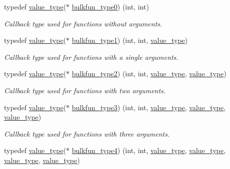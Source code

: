 \begin{DoxyCompactItemize}
typedef \hyperlink{namespacemu_a17d4f113a4b88b8d971cca8ddbbe8a47}{value\+\_\+type}($\ast$ \hyperlink{namespacemu_aff9adf757e90a2398326a3cb10585cf1}{bulkfun\+\_\+type0}) (int, int)
\begin{DoxyCompactList}\small\item\em Callback type used for functions without arguments. \end{DoxyCompactList}\item 
typedef \hyperlink{namespacemu_a17d4f113a4b88b8d971cca8ddbbe8a47}{value\+\_\+type}($\ast$ \hyperlink{namespacemu_a2bd588710432e6e34eae3e2af4ba3862}{bulkfun\+\_\+type1}) (int, int, \hyperlink{namespacemu_a17d4f113a4b88b8d971cca8ddbbe8a47}{value\+\_\+type})
\begin{DoxyCompactList}\small\item\em Callback type used for functions with a single arguments. \end{DoxyCompactList}\item 
typedef \hyperlink{namespacemu_a17d4f113a4b88b8d971cca8ddbbe8a47}{value\+\_\+type}($\ast$ \hyperlink{namespacemu_a9faa755ea34c6e8de3895013e649a713}{bulkfun\+\_\+type2}) (int, int, \hyperlink{namespacemu_a17d4f113a4b88b8d971cca8ddbbe8a47}{value\+\_\+type}, \hyperlink{namespacemu_a17d4f113a4b88b8d971cca8ddbbe8a47}{value\+\_\+type})
\begin{DoxyCompactList}\small\item\em Callback type used for functions with two arguments. \end{DoxyCompactList}\item 
typedef \hyperlink{namespacemu_a17d4f113a4b88b8d971cca8ddbbe8a47}{value\+\_\+type}($\ast$ \hyperlink{namespacemu_a441194d09cb0e9331dbfdaf74f59efd3}{bulkfun\+\_\+type3}) (int, int, \hyperlink{namespacemu_a17d4f113a4b88b8d971cca8ddbbe8a47}{value\+\_\+type}, \hyperlink{namespacemu_a17d4f113a4b88b8d971cca8ddbbe8a47}{value\+\_\+type}, \hyperlink{namespacemu_a17d4f113a4b88b8d971cca8ddbbe8a47}{value\+\_\+type})
\begin{DoxyCompactList}\small\item\em Callback type used for functions with three arguments. \end{DoxyCompactList}\item 
typedef \hyperlink{namespacemu_a17d4f113a4b88b8d971cca8ddbbe8a47}{value\+\_\+type}($\ast$ \hyperlink{namespacemu_a6b7ce6e1f888b02222d2765d1f521507}{bulkfun\+\_\+type4}) (int, int, \hyperlink{namespacemu_a17d4f113a4b88b8d971cca8ddbbe8a47}{value\+\_\+type}, \hyperlink{namespacemu_a17d4f113a4b88b8d971cca8ddbbe8a47}{value\+\_\+type}, \hyperlink{namespacemu_a17d4f113a4b88b8d971cca8ddbbe8a47}{value\+\_\+type}, \hyperlink{namespacemu_a17d4f113a4b88b8d971cca8ddbbe8a47}{value\+\_\+type})

\end{DoxyCompactItemize}
